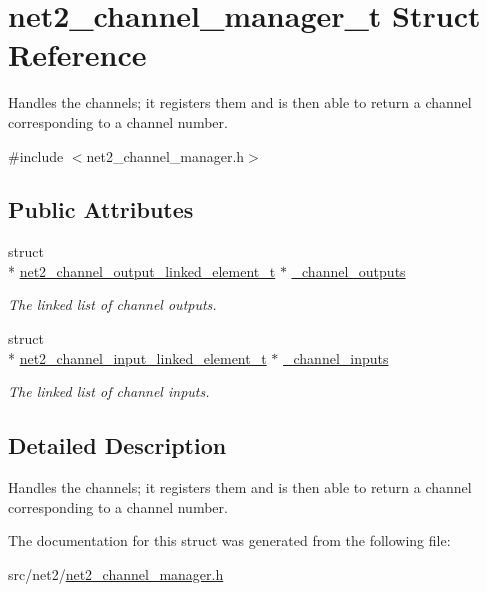 \hypertarget{structnet2__channel__manager__t}{\section{net2\-\_\-channel\-\_\-manager\-\_\-t Struct Reference}
\label{structnet2__channel__manager__t}
}


Handles the channels; it registers them and is then able to return a channel corresponding to a channel number.  




{\ttfamily \#include $<$net2\-\_\-channel\-\_\-manager.\-h$>$}

\subsection*{Public Attributes}
\begin{DoxyCompactItemize}
\item 
\hypertarget{structnet2__channel__manager__t_a994bf9242cb70c45711e2a670123a18e}{struct \\*
\hyperlink{structnet2__channel__output__linked__element__t}{net2\-\_\-channel\-\_\-output\-\_\-linked\-\_\-element\-\_\-t} $\ast$ \hyperlink{structnet2__channel__manager__t_a994bf9242cb70c45711e2a670123a18e}{\-\_\-channel\-\_\-outputs}}\label{structnet2__channel__manager__t_a994bf9242cb70c45711e2a670123a18e}

\begin{DoxyCompactList}\small\item\em The linked list of channel outputs. \end{DoxyCompactList}\item 
\hypertarget{structnet2__channel__manager__t_a3e16fdcf5489413c2fabc6c009545ae1}{struct \\*
\hyperlink{structnet2__channel__input__linked__element__t}{net2\-\_\-channel\-\_\-input\-\_\-linked\-\_\-element\-\_\-t} $\ast$ \hyperlink{structnet2__channel__manager__t_a3e16fdcf5489413c2fabc6c009545ae1}{\-\_\-channel\-\_\-inputs}}\label{structnet2__channel__manager__t_a3e16fdcf5489413c2fabc6c009545ae1}

\begin{DoxyCompactList}\small\item\em The linked list of channel inputs. \end{DoxyCompactList}\end{DoxyCompactItemize}


\subsection{Detailed Description}
Handles the channels; it registers them and is then able to return a channel corresponding to a channel number. 

The documentation for this struct was generated from the following file\-:\begin{DoxyCompactItemize}
\item 
src/net2/\hyperlink{net2__channel__manager_8h}{net2\-\_\-channel\-\_\-manager.\-h}\end{DoxyCompactItemize}
